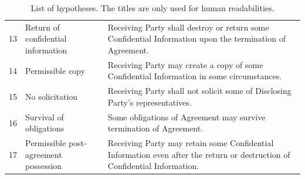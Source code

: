 \begin{table}[t]
\begin{tabularx}{\linewidth}{rlX}
        13 & Return of confidential information & Receiving Party shall destroy or return some Confidential Information upon the termination of Agreement. \\
        14 & Permissible copy & Receiving Party may create a copy of some Confidential Information in some circumstances. \\
        15 & No solicitation & Receiving Party shall not solicit some of Disclosing Party's representatives. \\
        16 & Survival of obligations & Some obligations of Agreement may survive termination of Agreement. \\
        17 & Permissible post-agreement possession & Receiving Party may retain some Confidential Information even after the return or destruction of Confidential Information. \\
        \bottomrule
    \end{tabularx}
    \caption{List of hypotheses. The titles are only used for human readabilities.}\label{tab:hypotheses}
\end{table}
